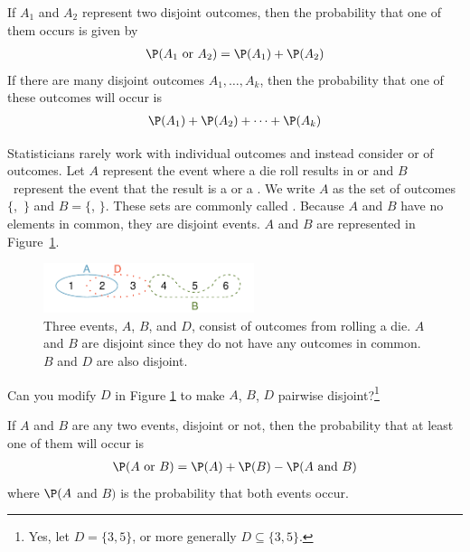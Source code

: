 \begin{termBox}{ If $A_1$ and $A_2$ represent two disjoint outcomes, then the probability that one of them occurs is given by
\begin{eqnarray*}
\P(A_1\text{ or } A_2) = \P(A_1) + \P(A_2)
\end{eqnarray*}
If there are many disjoint outcomes $A_1,\dots,A_k$, then the probability that one of these outcomes will occur is
\begin{eqnarray}
\P(A_1) + \P(A_2) + \cdots + \P(A_k)
\end{eqnarray}
}
\end{termBox}


Statisticians rarely work with individual outcomes and instead consider  or  of outcomes. Let $A$ represent the event where a die roll results in  or  and $B$~represent the event that the result is a  or a . We write $A$ as the set of outcomes $\{$,~$\}$ and $B=\{$, $\}$. These sets are commonly called . Because $A$ and $B$ have no elements in common, they are disjoint events. $A$ and $B$ are represented in Figure~\ref{disjointSets}.

\begin{figure}%
\centering
\includegraphics[width=0.55\textwidth]{ch_probability/figures/disjointSets/disjointSets}
\caption{Three events, $A$, $B$, and $D$, consist of outcomes from rolling a die. $A$ and $B$ are disjoint since they do not have any outcomes in common. $B$ and $D$ are also disjoint.}
\label{disjointSets}
\end{figure}

\begin{exercise}\label{lara}
Can you modify $D$ in Figure \ref{disjointSets} to make $A$, $B$, $D$ pairwise disjoint?\footnote{Yes, let $D=\{3,5\}$, or more generally $D\subseteq\{3,5\}$.}
\end{exercise}



\begin{termBox}{ If $A$ and $B$ are any two events, disjoint or not, then the probability that at least one of them will occur is
\begin{eqnarray}
\P(A\text{ or }B) = \P(A) + \P(B) - \P(A\text{ and }B)
\label{generalAdditionRule}
\end{eqnarray}
where $\P(A$ and $B)$ is the probability that both events occur.}
\end{termBox}

